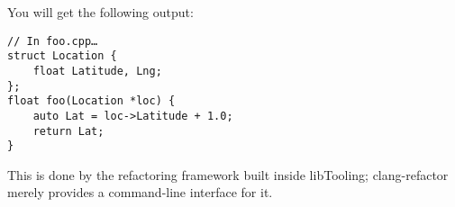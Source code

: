 You will get the following output:

\begin{lstlisting}[style=styleCXX]
// In foo.cpp…
struct Location {
	float Latitude, Lng;
};
float foo(Location *loc) {
	auto Lat = loc->Latitude + 1.0;
	return Lat;
}
\end{lstlisting}

This is done by the refactoring framework built inside libTooling; clang-refactor merely provides a command-line interface for it.

























